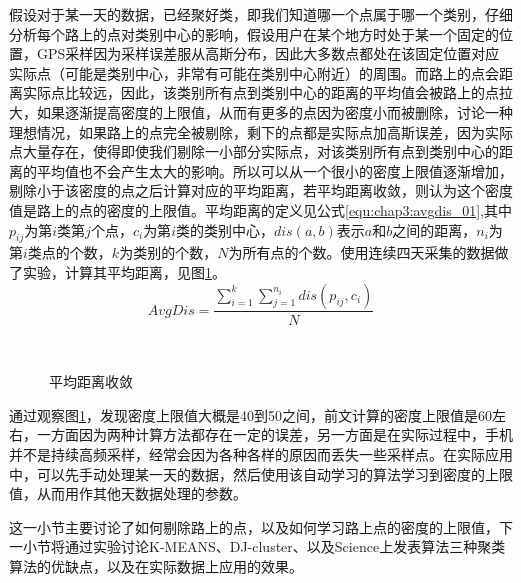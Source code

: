\par 假设对于某一天的数据，已经聚好类，即我们知道哪一个点属于哪一个类别，仔细分析每个路上的点对类别中心的影响，假设用户在某个地方时处于某一个固定的位置，GPS采样因为采样误差服从高斯分布，因此大多数点都处在该固定位置对应实际点（可能是类别中心，非常有可能在类别中心附近）的周围。而路上的点会距离实际点比较远，因此，该类别所有点到类别中心的距离的平均值会被路上的点拉大，如果逐渐提高密度的上限值，从而有更多的点因为密度小而被删除，讨论一种理想情况，如果路上的点完全被剔除，剩下的点都是实际点加高斯误差，因为实际点大量存在，使得即使我们剔除一小部分实际点，对该类别所有点到类别中心的距离的平均值也不会产生太大的影响。所以可以从一个很小的密度上限值逐渐增加，剔除小于该密度的点之后计算对应的平均距离，若平均距离收敛，则认为这个密度值是路上的点的密度的上限值。平均距离的定义见公式\ref{equ:chap3:avgdis_01},其中$p_{ij}$为第$i$类第$j$个点，$c_{i}$为第$i$类的类别中心，$dis(a,b)$表示$a$和$b$之间的距离，$n_{i}$为第$i$类点的个数，$k$为类别的个数，$N$为所有点的个数。使用连续四天采集的数据做了实验，计算其平均距离，见图\ref{fig:3_7}。
\begin{equation}
\label{equ:chap3:avgdis_01}
AvgDis=\frac{\sum_{i=1}^{k}\sum_{j=1}^{n_{i}}dis(p_{ij},c_{i})}{N}
\end{equation}
\begin{figure}[htb]
  \centering%
  \\
  \caption{平均距离收敛}
  \label{fig:3_7}
\end{figure}
\par 通过观察图\ref{fig:3_7}，发现密度上限值大概是40到50之间，前文计算的密度上限值是60左右，一方面因为两种计算方法都存在一定的误差，另一方面是在实际过程中，手机并不是持续高频采样，经常会因为各种各样的原因而丢失一些采样点。在实际应用中，可以先手动处理某一天的数据，然后使用该自动学习的算法学习到密度的上限值，从而用作其他天数据处理的参数。
\par 这一小节主要讨论了如何剔除路上的点，以及如何学习路上点的密度的上限值，下一小节将通过实验讨论K-MEANS、DJ-cluster、以及Science上发表算法三种聚类算法的优缺点，以及在实际数据上应用的效果。
